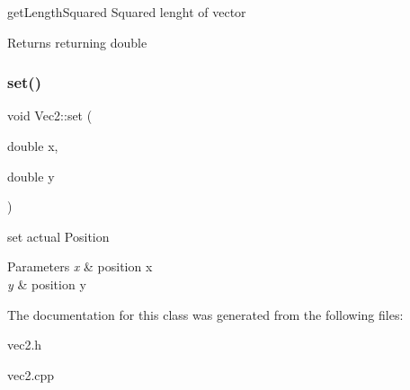 get\+Length\+Squared Squared lenght of vector 

\begin{DoxyReturn}{Returns}
returning double 
\end{DoxyReturn}
\mbox{\label{classVec2_a3574fcb9ccc0abd7e7e82abe22dabb83}} 
\subsubsection{\texorpdfstring{set()}{set()}}
{\footnotesize\ttfamily void Vec2\+::set (\begin{DoxyParamCaption}\item[{double}]{x,  }\item[{double}]{y }\end{DoxyParamCaption})}



set actual Position 


\begin{DoxyParams}{Parameters}
{\em x} & position x \\
\hline
{\em y} & position y \\
\hline
\end{DoxyParams}


The documentation for this class was generated from the following files\+:\begin{DoxyCompactItemize}
\item 
vec2.\+h\item 
vec2.\+cpp\end{DoxyCompactItemize}
